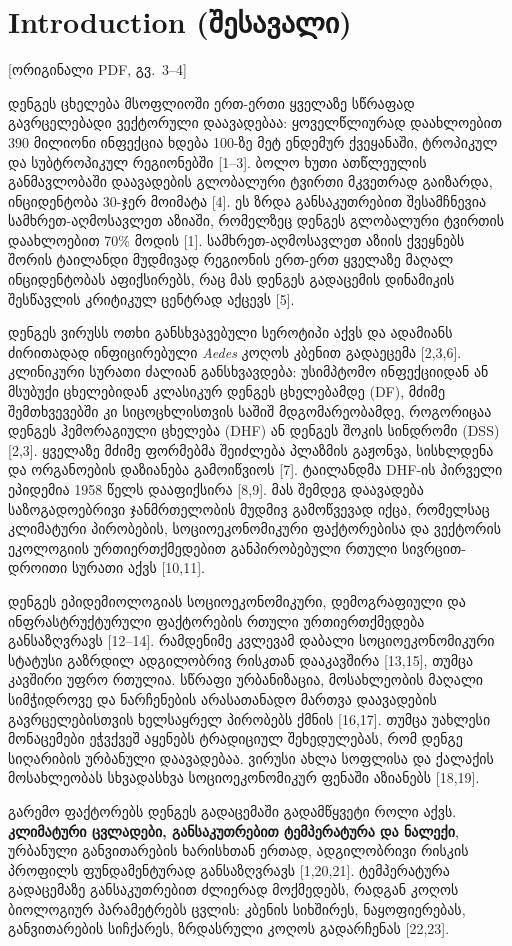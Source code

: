 \documentclass[11pt,a4paper]{article}
\newcommand{\imp}[1]{\textbf{\color{importred}#1}}
\newcommand{\pg}[1]{{\small\color{gray}[ორიგინალი PDF, გვ.~#1]}}
\begin{document}
\section{Introduction (შესავალი)} \pg{3--4}

დენგეს ცხელება მსოფლიოში ერთ-ერთი ყველაზე სწრაფად გავრცელებადი ვექტორული დაავადებაა: ყოველწლიურად
დაახლოებით 390 მილიონი ინფექცია ხდება 100-ზე მეტ ენდემურ ქვეყანაში, ტროპიკულ და სუბტროპიკულ რეგიონებში [1--3].
ბოლო ხუთი ათწლეულის განმავლობაში დაავადების გლობალური ტვირთი მკვეთრად გაიზარდა, ინციდენტობა 30-ჯერ მოიმატა [4].
ეს ზრდა განსაკუთრებით შესამჩნევია სამხრეთ-აღმოსავლეთ აზიაში, რომელზეც დენგეს გლობალური ტვირთის დაახლოებით
70\% მოდის [1]. სამხრეთ-აღმოსავლეთ აზიის ქვეყნებს შორის ტაილანდი მუდმივად რეგიონის ერთ-ერთ ყველაზე მაღალ
ინციდენტობას აფიქსირებს, რაც მას დენგეს გადაცემის დინამიკის შესწავლის კრიტიკულ ცენტრად აქცევს [5].

დენგეს ვირუსს ოთხი განსხვავებული სეროტიპი აქვს და ადამიანს ძირითადად ინფიცირებული \textit{Aedes} კოღოს
კბენით გადაეცემა [2,3,6]. კლინიკური სურათი ძალიან განსხვავდება: უსიმპტომო ინფექციიდან ან მსუბუქი
ცხელებიდან კლასიკურ დენგეს ცხელებამდე (DF), მძიმე შემთხვევებში კი სიცოცხლისთვის საშიშ მდგომარეობამდე,
როგორიცაა დენგეს ჰემორაგიული ცხელება (DHF) ან დენგეს შოკის სინდრომი (DSS) [2,3]. ყველაზე მძიმე
ფორმებმა შეიძლება პლაზმის გაჟონვა, სისხლდენა და ორგანოების დაზიანება გამოიწვიოს [7]. ტაილანდმა
DHF-ის პირველი ეპიდემია 1958 წელს დააფიქსირა [8,9]. მას შემდეგ დაავადება საზოგადოებრივი ჯანმრთელობის
მუდმივ გამოწვევად იქცა, რომელსაც კლიმატური პირობების, სოციოეკონომიკური ფაქტორებისა და ვექტორის ეკოლოგიის
ურთიერთქმედებით განპირობებული რთული სივრცით-დროითი სურათი აქვს [10,11].

დენგეს ეპიდემიოლოგიას სოციოეკონომიკური, დემოგრაფიული და ინფრასტრუქტურული ფაქტორების რთული
ურთიერთქმედება განსაზღვრავს [12--14]. რამდენიმე კვლევამ დაბალი სოციოეკონომიკური სტატუსი გაზრდილ
ადგილობრივ რისკთან დააკავშირა [13,15], თუმცა კავშირი უფრო რთულია. სწრაფი ურბანიზაცია, მოსახლეობის
მაღალი სიმჭიდროვე და ნარჩენების არასათანადო მართვა დაავადების გავრცელებისთვის ხელსაყრელ პირობებს ქმნის [16,17].
თუმცა უახლესი მონაცემები ეჭვქვეშ აყენებს ტრადიციულ შეხედულებას, რომ დენგე სიღარიბის ურბანული დაავადებაა.
ვირუსი ახლა სოფლისა და ქალაქის მოსახლეობას სხვადასხვა სოციოეკონომიკურ ფენაში აზიანებს [18,19].

გარემო ფაქტორებს დენგეს გადაცემაში გადამწყვეტი როლი აქვს. \imp{კლიმატური ცვლადები, განსაკუთრებით
ტემპერატურა და ნალექი}, ურბანული განვითარების ხარისხთან ერთად, ადგილობრივი რისკის პროფილს
ფუნდამენტურად განსაზღვრავს [1,20,21]. ტემპერატურა გადაცემაზე განსაკუთრებით ძლიერად მოქმედებს,
რადგან კოღოს ბიოლოგიურ პარამეტრებს ცვლის: კბენის სიხშირეს, ნაყოფიერებას, განვითარების სიჩქარეს,
ზრდასრული კოღოს გადარჩენას [22,23].
\end{document}
